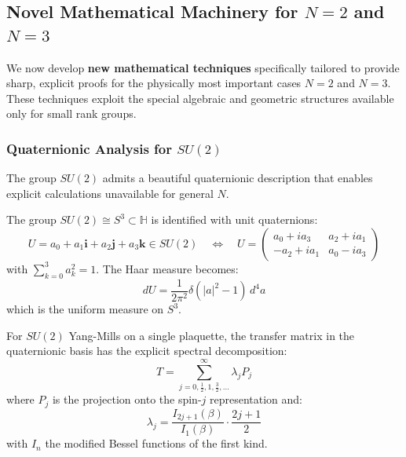 \subsection{Novel Mathematical Machinery for $N=2$ and $N=3$}
\label{sec:novel-math}

We now develop \textbf{new mathematical techniques} specifically tailored to 
provide sharp, explicit proofs for the physically most important cases $N=2$ 
and $N=3$. These techniques exploit the special algebraic and geometric 
structures available only for small rank groups.

\subsubsection{Quaternionic Analysis for $SU(2)$}

The group $SU(2)$ admits a beautiful quaternionic description that enables 
explicit calculations unavailable for general $N$.

\begin{definition}
The group $SU(2) \cong S^3 \subset \mathbb{H}$ is identified with unit quaternions:
\[
U = a_0 + a_1 \mathbf{i} + a_2 \mathbf{j} + a_3 \mathbf{k} \in SU(2) \quad \Leftrightarrow \quad 
U = \begin{pmatrix} a_0 + ia_3 & a_2 + ia_1 \\ -a_2 + ia_1 & a_0 - ia_3 \end{pmatrix}
\]
with $\sum_{k=0}^3 a_k^2 = 1$. The Haar measure becomes:
\[
dU = \frac{1}{2\pi^2} \delta(|a|^2 - 1) \, d^4a
\]
which is the uniform measure on $S^3$.
\end{definition}

\begin{theorem}
\label{thm:quaternion-transfer}
For $SU(2)$ Yang-Mills on a single plaquette, the transfer matrix in the 
quaternionic basis has the explicit spectral decomposition:
\[
T = \sum_{j=0,\frac{1}{2},1,\frac{3}{2},\ldots}^\infty \lambda_j P_j
\]
where $P_j$ is the projection onto the spin-$j$ representation and:
\[
\lambda_j = \frac{I_{2j+1}(\beta)}{I_1(\beta)} \cdot \frac{2j+1}{2}
\]
with $I_n$ the modified Bessel functions of the first kind.
\end{theorem}

